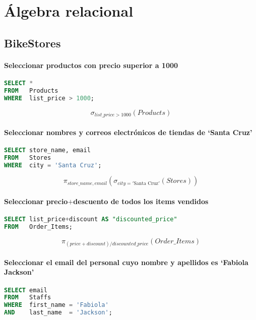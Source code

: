 \chapter{Álgebra relacional}

\section{BikeStores}

\subsubsection{Seleccionar productos con precio superior a 1000}

\begin{lstlisting}[language=SQL]
SELECT *
FROM   Products
WHERE  list_price > 1000;
\end{lstlisting}

\[\sigma_{list\_price>1000}(Products)\]

\subsubsection{Seleccionar nombres y correos electrónicos de tiendas de `Santa Cruz'}

\begin{lstlisting}[language=SQL]
SELECT store_name, email
FROM   Stores
WHERE  city = 'Santa Cruz';
\end{lstlisting}

\[\pi_{store\_name,email}(\sigma_{city='\text{Santa Cruz}'}(Stores))\]

\subsubsection{Seleccionar precio$+$descuento de todos los items vendidos}

\begin{lstlisting}[language=SQL]
SELECT list_price+discount AS "discounted_price"
FROM   Order_Items;
\end{lstlisting}

\[\pi_{(price+discount)/discounted\_price}(Order\_Items)\]

\subsubsection{Seleccionar el email del personal cuyo nombre y apellidos es `Fabiola Jackson'}

\begin{lstlisting}[language=SQL]
SELECT email
FROM   Staffs
WHERE  first_name = 'Fabiola'
AND    last_name  = 'Jackson';
\end{lstlisting}

